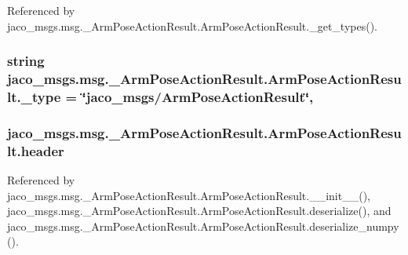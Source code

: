 Referenced by jaco\+\_\+msgs.\+msg.\+\_\+\+Arm\+Pose\+Action\+Result.\+Arm\+Pose\+Action\+Result.\+\_\+get\+\_\+types().

\subsubsection[{\texorpdfstring{\+\_\+type}{_type}}]{\setlength{\rightskip}{0pt plus 5cm}string jaco\+\_\+msgs.\+msg.\+\_\+\+Arm\+Pose\+Action\+Result.\+Arm\+Pose\+Action\+Result.\+\_\+type = \char`\"{}jaco\+\_\+msgs/{\bf Arm\+Pose\+Action\+Result}\char`\"{}\hspace{0.3cm}{\ttfamily [static]}, {\ttfamily [private]}}\hypertarget{classjaco__msgs_1_1msg_1_1__ArmPoseActionResult_1_1ArmPoseActionResult_a8944c3111f125672f680f500ccda3347}{}\label{classjaco__msgs_1_1msg_1_1__ArmPoseActionResult_1_1ArmPoseActionResult_a8944c3111f125672f680f500ccda3347}
\subsubsection[{\texorpdfstring{header}{header}}]{\setlength{\rightskip}{0pt plus 5cm}jaco\+\_\+msgs.\+msg.\+\_\+\+Arm\+Pose\+Action\+Result.\+Arm\+Pose\+Action\+Result.\+header}\hypertarget{classjaco__msgs_1_1msg_1_1__ArmPoseActionResult_1_1ArmPoseActionResult_a91cd51f43f8421923ec5cdfbfd6a340f}{}\label{classjaco__msgs_1_1msg_1_1__ArmPoseActionResult_1_1ArmPoseActionResult_a91cd51f43f8421923ec5cdfbfd6a340f}


Referenced by jaco\+\_\+msgs.\+msg.\+\_\+\+Arm\+Pose\+Action\+Result.\+Arm\+Pose\+Action\+Result.\+\_\+\+\_\+init\+\_\+\+\_\+(), jaco\+\_\+msgs.\+msg.\+\_\+\+Arm\+Pose\+Action\+Result.\+Arm\+Pose\+Action\+Result.\+deserialize(), and jaco\+\_\+msgs.\+msg.\+\_\+\+Arm\+Pose\+Action\+Result.\+Arm\+Pose\+Action\+Result.\+deserialize\+\_\+numpy().

